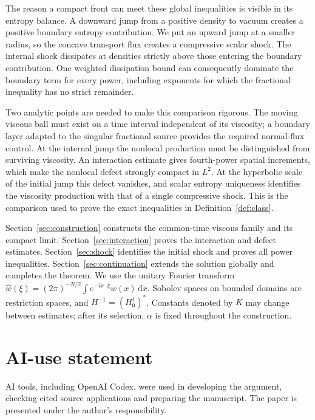 \documentclass[11pt]{article}
\newcommand{\dd}{\,\mathrm d}
\theoremstyle{definition}
\numberwithin{equation}{section}
\begin{document}
The reason a compact front can meet these global inequalities is visible
in its entropy balance. A downward jump from a positive density to vacuum
creates a positive boundary entropy contribution. We put an upward jump at a smaller
radius, so the concave transport flux creates a compressive scalar shock.
The internal shock dissipates at densities strictly above those entering
the boundary contribution. One weighted dissipation bound can consequently dominate
the boundary term for every power, including exponents for which the fractional inequality
has no strict remainder.

Two analytic points are needed to make this comparison rigorous. The
moving viscous ball must exist on a time interval independent of its
viscosity; a boundary layer adapted to the singular fractional source
provides the required normal-flux control. At the internal jump the
nonlocal production must be distinguished from surviving viscosity.
An interaction estimate gives fourth-power spatial increments, which
make the nonlocal defect strongly compact in $L^2$. At the hyperbolic
scale of the initial jump this defect vanishes, and scalar entropy
uniqueness identifies the viscosity production with that of a single
compressive shock. This is the comparison used to prove the exact
inequalities in Definition~\ref{def:class}.

Section~\ref{sec:construction} constructs the common-time viscous family
and its compact limit. Section~\ref{sec:interaction} proves the
interaction and defect estimates. Section~\ref{sec:shock} identifies the
initial shock and proves all power inequalities. Section~\ref{sec:continuation}
extends the solution globally and completes the theorem.
We use the unitary Fourier transform
$\widehat w(\xi)=(2\pi)^{-N/2}\int e^{-ix\cdot\xi}w(x)\dd x$.
Sobolev spaces on bounded domains are restriction spaces, and
$H^{-1}=(H^1_0)^*$. Constants denoted by $K$ may change between estimates;
after its selection, $\alpha$ is fixed throughout the construction.







\section*{AI-use statement}
AI tools, including OpenAI Codex, were used in developing the argument, checking cited source
applications and preparing the manuscript. The paper is presented under
the author's responsibility.



\end{document}
